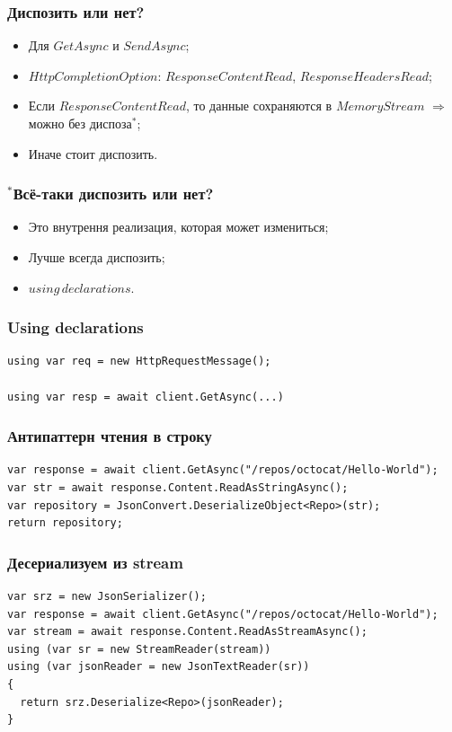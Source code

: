 \documentclass[17pt,aspectratio=169]{beamer}
\begin{document}
\begin{frame}
\frametitle{Диспозить или нет?}
\begin{itemize}
	\item <1-> Для $GetAsync$ и $SendAsync$;
	\item <2-> $HttpCompletionOption$: $ResponseContentRead$, $ResponseHeadersRead$;
	\item <3-> Если $ResponseContentRead$, то данные сохраняются в $MemoryStream$ $\Rightarrow$ можно без диспоза$^*$;
	\item <4-> Иначе стоит диспозить. 
\end{itemize}
\end{frame}

\begin{frame}
\frametitle{$^*$Всё-таки диспозить или нет?}
\begin{itemize}
	\item <1-> Это внутрення реализация, которая может измениться;
	\item <2-> Лучше всегда диспозить;
	\item <3-> $using\,declarations$.
\end{itemize}
\end{frame}

\begin{frame}[fragile]
\frametitle{Using declarations}
\begin{lstlisting}
using var req = new HttpRequestMessage();

using var resp = await client.GetAsync(...)
\end{lstlisting}
\end{frame}

\begin{frame}[fragile]
\frametitle{Антипаттерн чтения в строку}
\begin{lstlisting}
var response = await client.GetAsync("/repos/octocat/Hello-World");
var str = await response.Content.ReadAsStringAsync();
var repository = JsonConvert.DeserializeObject<Repo>(str);
return repository;
\end{lstlisting}
\end{frame}

\begin{frame}[fragile]
\frametitle{Десериализуем из stream}
\begin{lstlisting}
var srz = new JsonSerializer();
var response = await client.GetAsync("/repos/octocat/Hello-World");
var stream = await response.Content.ReadAsStreamAsync();
using (var sr = new StreamReader(stream))
using (var jsonReader = new JsonTextReader(sr))
{
  return srz.Deserialize<Repo>(jsonReader);
}
\end{lstlisting}
\end{frame}
\end{document}
